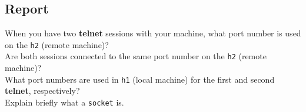 \documentclass[10pt,a4paper]{article}
\numberwithin{equation}{section}
\numberwithin{figure}{section}
\numberwithin{table}{section}
\begin{document}
    \subsection*{Report}
    When you have two \textbf{telnet} sessions with your machine, what port number is used on the \texttt{h2} (remote machine)? \\
    Are both sessions connected to the same port number on the \texttt{h2} (remote machine)? \\
    What port numbers are used in \texttt{h1} (local machine) for the first and second \textbf{telnet}, respectively? \\
    Explain briefly what a \texttt{socket} is. \\
\end{document}
